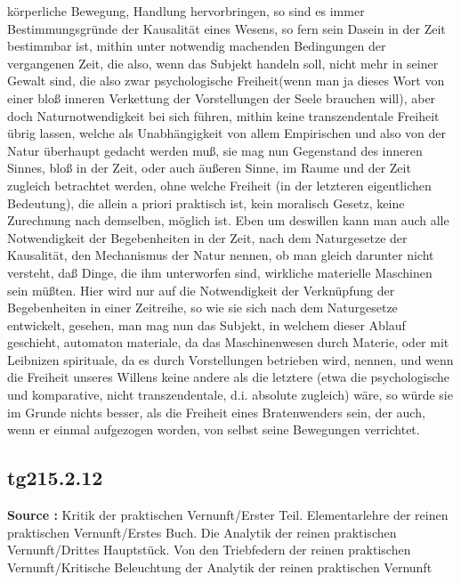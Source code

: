 \documentclass[a4paper,12pt,twoside]{book}
\begin{document}
körperliche Bewegung,  Handlung hervorbringen, so sind es immer Bestimmungsgründe der Kausalität eines Wesens, so fern sein Dasein in der Zeit bestimmbar ist, mithin unter notwendig machenden Bedingungen der vergangenen Zeit, die also, wenn das Subjekt handeln soll, nicht mehr in seiner Gewalt sind, die also zwar psychologische Freiheit(wenn man ja dieses Wort von einer bloß inneren Verkettung der Vorstellungen der Seele brauchen will), aber doch Naturnotwendigkeit bei sich führen, mithin keine transzendentale Freiheit übrig lassen, welche als Unabhängigkeit von allem Empirischen und also von der Natur überhaupt gedacht werden muß, sie mag nun Gegenstand des inneren Sinnes, bloß in der Zeit, oder auch äußeren Sinne, im Raume und der Zeit zugleich betrachtet werden, ohne welche Freiheit (in der letzteren eigentlichen Bedeutung), die allein a priori praktisch ist, kein moralisch Gesetz, keine Zurechnung nach demselben, möglich ist. Eben um deswillen kann man auch alle Notwendigkeit der Begebenheiten in der Zeit, nach dem Naturgesetze der Kausalität, den Mechanismus der Natur nennen, ob man gleich darunter nicht versteht, daß Dinge, die ihm unterworfen sind, wirkliche materielle Maschinen sein müßten. Hier wird nur auf die Notwendigkeit der Verknüpfung der Begebenheiten in einer Zeitreihe, so wie sie sich nach dem Naturgesetze entwickelt, gesehen, man mag nun das Subjekt, in welchem dieser Ablauf geschieht, automaton materiale, da das Maschinenwesen durch Materie, oder mit Leibnizen spirituale, da es durch Vorstellungen betrieben wird, nennen, und wenn die Freiheit unseres Willens keine andere als die letztere (etwa die psychologische und komparative, nicht transzendentale, d.i. absolute zugleich) wäre, so würde sie im Grunde nichts besser, als die Freiheit eines Bratenwenders sein, der auch, wenn er einmal aufgezogen worden, von selbst seine Bewegungen verrichtet. 
	
	\subsection*{tg215.2.12} 
	\textbf{Source : }Kritik der praktischen Vernunft/Erster Teil. Elementarlehre der reinen praktischen Vernunft/Erstes Buch. Die Analytik der reinen praktischen Vernunft/Drittes Hauptstück. Von den Triebfedern der reinen praktischen Vernunft/Kritische Beleuchtung der Analytik der reinen praktischen Vernunft\\  
	
\end{document}

